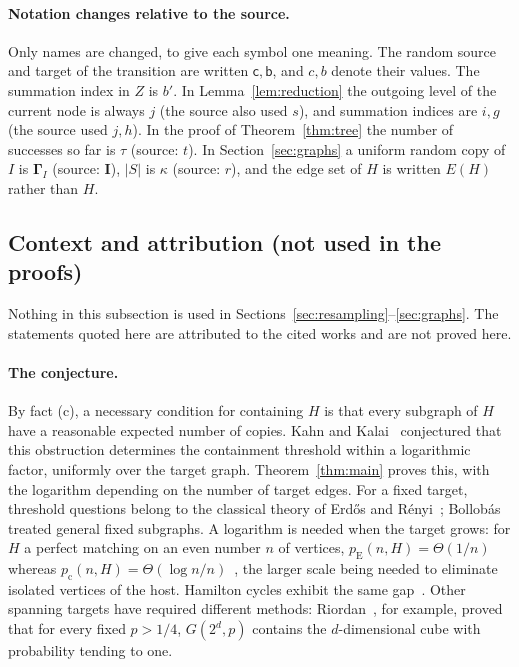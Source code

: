 \documentclass[11pt]{article}
\numberwithin{equation}{section}
\newcommand{\pc}{p_{\mathrm c}}
\newcommand{\pE}{p_{\mathrm E}}
\newcommand{\src}{\mathsf c}
\newcommand{\tgt}{\mathsf b}
\newcommand{\GG}{\boldsymbol\Gamma}
\begin{document}
\paragraph{Notation changes relative to the source.}
Only names are changed, to give each symbol one meaning. The random
source and target of the transition are written $\src,\tgt$, and
$c,b$ denote their values. The summation index in $Z$ is $b'$. In
Lemma~\ref{lem:reduction} the outgoing level of the current node is
always $j$ (the source also used $s$), and summation indices are $i,g$
(the source used $j,h$). In the proof of Theorem~\ref{thm:tree} the
number of successes so far is $\tau$ (source: $t$). In
Section~\ref{sec:graphs} a uniform random copy of $I$ is $\GG_I$
(source: $\boldsymbol I$), $|S|$ is $\kappa$ (source: $r$), and the edge
set of $H$ is written $E(H)$ rather than $H$.

\subsection{Context and attribution (not used in the proofs)}

Nothing in this subsection is used in
Sections~\ref{sec:resampling}--\ref{sec:graphs}. The statements quoted
here are attributed to the cited works and are not proved here.

\paragraph{The conjecture.}
By fact (c), a necessary condition for containing $H$ is that every
subgraph of $H$ have a reasonable expected number of copies. Kahn and
Kalai~\cite{KK07} conjectured that this obstruction determines the
containment threshold within a logarithmic factor, uniformly over the
target graph. Theorem~\ref{thm:main} proves this, with the logarithm
depending on the number of target edges. For a fixed target, threshold
questions belong to the classical theory of Erd\H{o}s and
R\'enyi~\cite{ER60}; Bollob\'as~\cite{Bollobas81} treated general fixed
subgraphs. A logarithm is needed when the target grows: for $H$ a
perfect matching on an even number $n$ of vertices,
$\pE(n,H)=\Theta(1/n)$ whereas
$\pc(n,H)=\Theta(\log n/n)$~\cite{ER66,KK07}, the larger scale being
needed to eliminate isolated vertices of the host. Hamilton cycles
exhibit the same gap~\cite{KK07}. Other spanning targets have required
different methods: Riordan~\cite{Riordan00}, for example, proved that
for every fixed $p>1/4$, $G(2^d,p)$ contains the $d$-dimensional cube
with probability tending to one.
\end{document}
